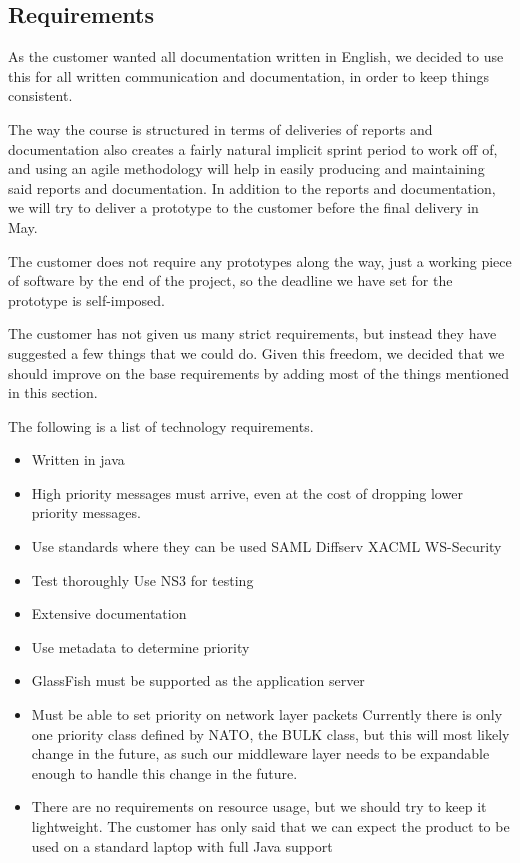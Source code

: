    \subsection{Requirements}\label{Requirements}
    As the customer wanted all documentation written in English, we decided to use this for all written communication and documentation, in order to keep things consistent.
    
    The way the course is structured in terms of deliveries of reports and documentation also creates a fairly natural implicit sprint period to work off of, and using an agile methodology will help in easily producing and maintaining said reports and documentation. In addition to the  reports and documentation, we will try to deliver a prototype to the customer before the final delivery in May.

    The customer does not require any prototypes along the way, just a working piece of software by the end of the project, so the deadline we have set for the prototype is self-imposed. 

    The customer has not given us many strict requirements, but instead they have suggested a few things that we could do. Given this freedom, we decided that we should improve on the base requirements by adding most of the things mentioned in this section. 

    The following is a list of technology requirements. 
    
    \begin{itemize}
        \item Written in java
        \item High priority messages must arrive, even at the cost of dropping lower priority messages.
        \item Use standards where they can be used
            \subitem SAML
            \subitem Diffserv
            \subitem XACML
            \subitem WS-Security
        \item Test thoroughly
            \subitem Use NS3 for testing
        \item Extensive documentation
        \item Use metadata to determine priority
        \item GlassFish must be supported as the application server
        \item Must be able to set priority on network layer packets
            \subitem Currently there is only one priority class defined by NATO, the BULK class, but this will most likely change in the future, as such our middleware layer needs to be expandable enough to handle this change in the future.
        \item There are no requirements on resource usage, but we should try to keep it lightweight.
            \subitem The customer has only said that we can expect the product to be used on a standard laptop with full Java support
    \end{itemize}

